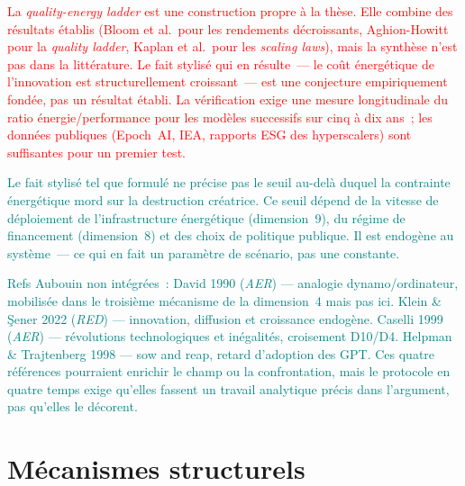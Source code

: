 \textcolor{red}{La \emph{quality-energy ladder} est une construction propre à la thèse. Elle combine des résultats établis (Bloom et al.\ pour les rendements décroissants, Aghion-Howitt pour la \emph{quality ladder}, Kaplan et al.\ pour les \emph{scaling laws}), mais la synthèse n'est pas dans la littérature. Le fait stylisé qui en résulte~--- le coût énergétique de l'innovation est structurellement croissant~--- est une conjecture empiriquement fondée, pas un résultat établi. La vérification exige une mesure longitudinale du ratio énergie/performance pour les modèles successifs sur cinq à dix ans~; les données publiques (Epoch~AI, IEA, rapports ESG des hyperscalers) sont suffisantes pour un premier test.}

\textcolor{teal}{Le fait stylisé tel que formulé ne précise pas le seuil au-delà duquel la contrainte énergétique mord sur la destruction créatrice. Ce seuil dépend de la vitesse de déploiement de l'infrastructure énergétique (dimension~9), du régime de financement (dimension~8) et des choix de politique publique. Il est endogène au système~--- ce qui en fait un paramètre de scénario, pas une constante.}

\textcolor{teal}{Refs Aubouin non intégrées~: David 1990 (\emph{AER}) --- analogie dynamo/ordinateur, mobilisée dans le troisième mécanisme de la dimension~4 mais pas ici. Klein \& \c{S}ener 2022 (\emph{RED}) --- innovation, diffusion et croissance endogène. Caselli 1999 (\emph{AER}) --- révolutions technologiques et inégalités, croisement D10/D4. Helpman \& Trajtenberg 1998 --- sow and reap, retard d'adoption des GPT. Ces quatre références pourraient enrichir le champ ou la confrontation, mais le protocole en quatre temps exige qu'elles fassent un travail analytique précis dans l'argument, pas qu'elles le décorent.}

\clearpage
\section{Mécanismes structurels}\label{sec:mechanisms}


